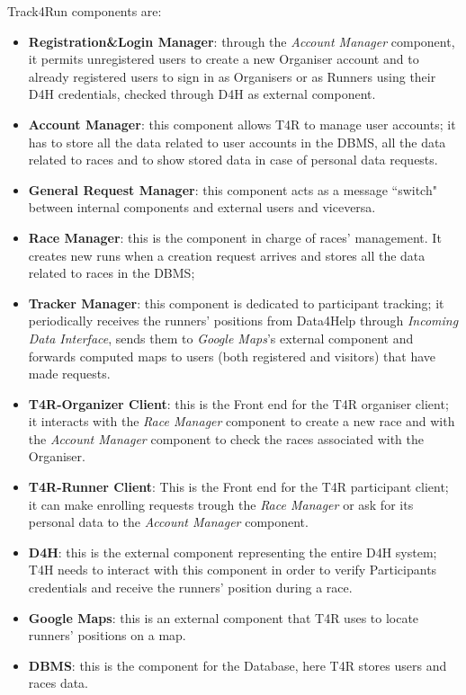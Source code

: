 Track4Run components are:
\begin{itemize}
    \item \textbf{Registration\&Login Manager}: through the \emph{Account Manager}  component, it permits unregistered users to create a new Organiser account and to already registered users to sign in as Organisers or as Runners using their D4H credentials, checked through D4H as external component.
    \item \textbf{Account Manager}: this component allows T4R to manage user accounts; it has to store all the data related to user accounts in the DBMS, all the data related to races and to show stored data in case of personal data requests.
    \item \textbf{General Request Manager}: this component acts as a message ``switch" between internal components and external users and viceversa.
    \item \textbf{Race Manager}: this is the component in charge of races' management. It creates new runs when a creation request arrives and stores all the data related to races in the DBMS;
    \item \textbf{Tracker Manager}: this component is dedicated to participant tracking; it periodically receives the runners' positions from Data4Help through \emph{Incoming Data Interface}, sends them to \emph{Google Maps}'s external component and forwards computed maps to users (both registered and visitors) that have made requests.
    \item \textbf{T4R-Organizer Client}: this is the Front end for the T4R organiser client; it interacts with the \emph{Race Manager} component to create a new race and with the \emph{Account Manager} component to check the races associated with the Organiser.
    \item \textbf{T4R-Runner Client}: This is the Front end for the T4R participant client; it can make enrolling requests trough the \emph{Race Manager} or ask for its personal data to the \emph{Account Manager} component.
    \item \textbf{D4H}: this is the external component representing the entire D4H system; T4H needs to interact with this component in order to verify Participants credentials and receive the runners' position during a race.
    \item \textbf{Google Maps}: this is an external component that T4R uses to locate runners' positions on a map.
    \item \textbf{DBMS}: this is the component for the Database, here T4R stores users and races data.
\end{itemize}
